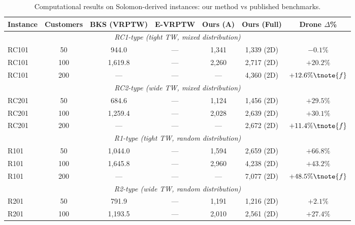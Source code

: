 \begin{table}[t]
\caption{Computational results on Solomon-derived instances: our method vs published benchmarks.}
\label{tab:results_vs_published}
\small
\centering
\begin{tabular}{l c c c c c c}
\toprule
\textbf{Instance} & \textbf{Customers} & \textbf{BKS (VRPTW)\tnote{a}} & \textbf{E-VRPTW\tnote{b}} & \textbf{Ours (A)\tnote{c}} & \textbf{Ours (Full)\tnote{d}} & \textbf{Drone $\Delta$\%} \\
\midrule
\multicolumn{7}{c}{\textit{RC1-type (tight TW, mixed distribution)}} \\
\midrule
RC101 & 50  & 944.0\tnote{e} & — & 1,341 & 1,339 (2D) & $-0.1\%$ \\
RC101 & 100 & 1,619.8\tnote{e} & — & 2,260 & 2,717 (2D) & $+20.2\%$ \\
RC101 & 200 & — & — & — & 4,360 (2D) & $+12.6\%\tnote{f}$ \\
\midrule
\multicolumn{7}{c}{\textit{RC2-type (wide TW, mixed distribution)}} \\
\midrule
RC201 & 50  & 684.6\tnote{e} & — & 1,124 & 1,456 (2D) & $+29.5\%$ \\
RC201 & 100 & 1,259.4\tnote{e} & — & 2,028 & 2,639 (2D) & $+30.1\%$ \\
RC201 & 200 & — & — & — & 2,672 (2D) & $+11.4\%\tnote{f}$ \\
\midrule
\multicolumn{7}{c}{\textit{R1-type (tight TW, random distribution)}} \\
\midrule
R101 & 50  & 1,044.0\tnote{e} & — & 1,594 & 2,659 (2D) & $+66.8\%$ \\
R101 & 100 & 1,645.8\tnote{e} & — & 2,960 & 4,238 (2D) & $+43.2\%$ \\
R101 & 200 & — & — & — & 7,077 (2D) & $+48.5\%\tnote{f}$ \\
\midrule
\multicolumn{7}{c}{\textit{R2-type (wide TW, random distribution)}} \\
\midrule
R201 & 50  & 791.9\tnote{e} & — & 1,191 & 1,216 (2D) & $+2.1\%$ \\
R201 & 100 & 1,193.5\tnote{e} & — & 2,010 & 2,561 (2D) & $+27.4\%$ \\

\end{tabular}
\end{table}
